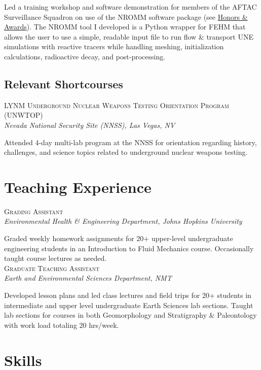 \documentclass[11pt, letterpaper]{article}
\newcommand{\years}[1]{\marginnote{\scriptsize #1}}
\begin{document}
    Led a training workshop and software demonstration for members of the AFTAC
     Surveillance Squadron on use of the NROMM software package (see
    \hyperref[sec:awards]{Honors \& Awards}).  The NROMM tool I developed is a
    Python wrapper for FEHM that allows the user to use a simple, readable
    input file to run flow \& transport UNE simulations with reactive tracers
    while handling meshing, initialization calculations, radioactive decay, and
    post-processing.

\subsection*{Relevant Shortcourses}
\label{sec:shortcourses}
\years{2023} \textsc{LYNM Underground Nuclear Weapons Testing Orientation Program (UNWTOP)}\\
\textit{Nevada National Security Site (NNSS), Las Vegas, NV}

    Attended 4-day multi-lab program at the NNSS for orientation regarding
    history, challenges, and science topics related to underground nuclear
    weapons testing. 


\section*{Teaching Experience}
\noindent
\years{2019}\textsc{Grading Assistant}\\
\textit{Environmental Health \& Engineering Department, Johns Hopkins University}

	Graded weekly homework assignments for 20+ upper-level undergraduate
	engineering students in an Introduction to Fluid Mechanics course.
	Occasionally taught course lectures as needed.\\

\years{2015 - 2016}\textsc{Graduate Teaching Assistant}\\
\textit{Earth and Environmental Sciences Department, NMT}

    Developed lesson plans and led class lectures and field trips for 20+
    students in intermediate and upper level undergraduate Earth Sciences lab
    sections. Taught lab sections for courses in both Geomorphology and Stratigraphy
    \& Paleontology with work load totaling 20 hrs/week.  

\section*{Skills}
\setlength{\parskip}{5pt}
\end{document}
